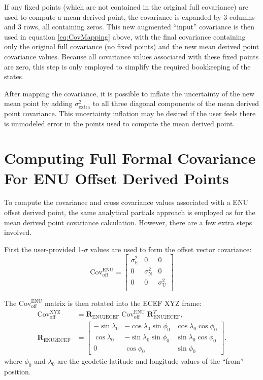 If any fixed points (which are not contained in the original full covariance) are used to compute a mean derived point, the covariance is expanded by 3 columns and 3 rows, all containing zeros.  This new augmented ``input'' covariance is then used in equation \ref{eq:CovMapping} above, with the final covariance containing only the original full covariance (no fixed points) and the new mean derived point covariance values.  Because all covariance values associated with these fixed points are zero, this step is only employed to simplify the required bookkeeping of the states.

After mapping the covariance, it is possible to inflate the uncertainty of the new mean point by adding $\sigma_{\text{extra}}^2$ to all three diagonal components of the mean derived point covariance.  This uncertainty inflation may be desired if the user feels there is unmodeled error in the points used to compute the mean derived point.
	
\section*{Computing Full Formal Covariance For ENU Offset Derived Points}

To compute the covariance and cross covariance values associated with a ENU offset derived point, the same analytical partials approach is employed as for the mean derived point covariance calculation. However, there are a few extra steps involved.

First the user-provided 1-$\sigma$ values are used to form the offset vector covariance:
\begin{equation}
\text{Cov}_{\text{off}}^{\text{ENU}} = \left[ \begin{array}{ccc} 
\sigma_{\text{E}}^2 & 0 & 0 \\
0 & \sigma_{\text{N}}^2 & 0 \\
0 & 0 & \sigma_{\text{U}}^2 \\
\end{array} \right]
\end{equation}

The $\text{Cov}_{\text{off}}^{\text{ENU}}$ matrix is then rotated into the ECEF XYZ frame:
\begin{equation}
\begin{split}
\text{Cov}_{\text{off}}^{\text{XYZ}} &= \mathbf{R}_{\text{ENU2ECEF}} \; \text{Cov}_{\text{off}}^{\text{ENU}} \; \mathbf{R}_{\text{ENU2ECEF}}^T,\\
\mathbf{R}_{\text{ENU2ECEF}}&=\left[\begin{array}{ccc}-\sin\lambda_0&-\cos\lambda_0\sin\phi_0&\cos\lambda_0\cos\phi_0\\\cos\lambda_0&-\sin\lambda_0\sin\phi_0&\sin\lambda_0\cos\phi_0\\0&\cos\phi_0&\sin\phi_0\end{array}\right].
\end{split}
\end{equation}
where $\phi_0$ and $\lambda_0$ are the geodetic latitude and longitude values of the ``from'' position. 

